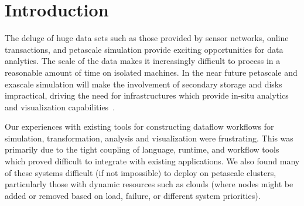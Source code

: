 \section{Introduction}

The deluge of huge data sets such as those provided by sensor
networks, online transactions, and petascale simulation provide 
exciting opportunities for data analytics.  
The scale of the data makes it increasingly difficult to process 
in a reasonable amount of time on isolated machines.
In the near future petascale and exascale simulation will make 
the involvement of secondary storage and disks impractical, driving
the need for infrastructures which provide in-situ analytics and
visualization capabilities~\cite{ma:in-site}.

Our experiences with existing tools for constructing dataflow workflows
for simulation, transformation, analysis and visualization were frustrating.
This was primarily due to the tight coupling of language, runtime, and
workflow tools which proved difficult to integrate with existing
applications.  
We also found many of these systems difficult (if not impossible)
to deploy on petascale clusters, particularly those with dynamic
resources such as clouds (where nodes might be added or removed based
on load, failure, or different system priorities).
%

